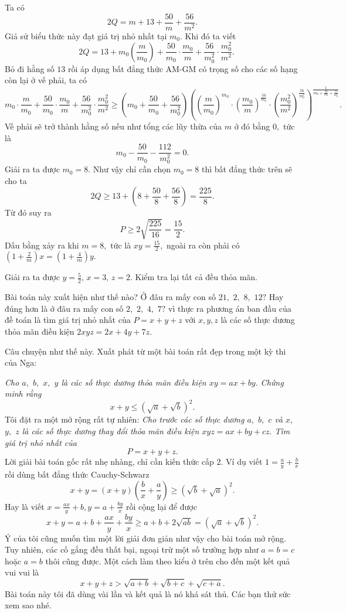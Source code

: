 \documentclass[12pt,a4paper]{book}
\begin{document}
Ta có
$$2Q = m+13+\frac{50}{m}+\frac{56}{m^2}.$$
Giả sử biểu thức này đạt giá trị nhỏ nhất tại $m_0.$ Khi đó ta viết
$$\quad 2 Q=13+m_{0}\left(\frac{m}{m_{0}}\right)+\frac{50}{m_{0}} \cdot \frac{m_{0}}{m}+\frac{56}{m_{0}^{2}} \cdot \frac{m_{0}^{2}}{m^{2}}.$$
Bỏ đi hằng số $13$ rồi áp dụng bất đẳng thức AM-GM có trọng số cho các số hạng còn lại ở vế phải, ta có
\[m_{0} \cdot \frac{m}{m_{0}} +\frac{50}{m_{0}} \cdot \frac{m_{0}}{m}+\frac{56}{m_{0}^{2}} \cdot \frac{m_{0}^{2}}{m^{2}} \geq\left(m_{0}+\frac{50}{m_{0}}+\frac{56}{m_{0}^{2}}\right)\left(\left(\frac{m}{m_{0}}\right)^{m_{0}} \cdot\left(\frac{m_{0}}{m}\right)^{\frac{50}{m_{0}}} \cdot\left(\frac{m_{0}^{2}}{m^{2}}\right)^{\frac{56}{m_{0}^{2}}}\right)^ \frac{1}{m_{0}+\frac{50}{m_{0}}+\frac{55}{m_{0}^{2}}}.\]
Vế phải sẽ trở thành hằng số nếu như tổng các lũy thừa của $m$ ở đó bằng $0,$ tức là
$$m_{0}-\frac{50}{m_{0}}-\frac{112}{m_{0}^{2}}=0.$$
Giải ra ta được ${m}_{0}=8 .$ Như vậy chỉ cần chọn ${m}_{0}=8$ thì bất đẳng thức trên sẽ cho ta
$$2 Q \geq 13+\left(8+\frac{50}{8}+\frac{56}{8}\right)=\frac{225}{8} .$$
Từ đó suy ra
$$P \geq 2 \sqrt{\frac{225}{16}}=\frac{15}{2}.$$
Dấu bằng xảy ra khi $m = 8,$ tức là $xy = \frac{15}{2},$ ngoài ra còn phải có $\left(1+\frac{2}{m}\right) x=\left(1+\frac{4}{m}\right) y.$

Giải ra ta được $y=\frac{5}{2},\,x=3,\,z=2.$ Kiểm tra lại tất cả đều thỏa mãn.

Bài toán này xuất hiện như thế nào? Ở đâu ra mấy con số $21,$ $2,$ $8,$ $12?$ Hay đúng hơn là ở đâu ra mấy con số $2,$ $2,$ $4,$ $7?$ vì thực ra phương án ban đầu của đề toán là tìm giá trị nhỏ nhất của ${P}={x}+{y}+{z}$ với ${x}, {y}, {z}$ là các số thực dương thỏa mãn điều kiện $2 {xyz}=2 {x}+4 {y}+7 {z}.$

Câu chuyện như thế này. Xuất phát từ một bài toán rất đẹp trong một kỳ thi của Nga:

\textit{Cho $a,$ $b,$ $x,$ $y$ là các số thực dương thỏa mãn điều kiện $xy = ax + by.$ Chứng minh rằng}
$$x+y \leq(\sqrt{a}+\sqrt{b})^{2}.$$
Tôi đặt ra một mở rộng rất tự nhiên: \textit{Cho trước các số thực dương $a,$ $b,$ $c$ và $x,$ $y,$ $z$ là các số thực dương thay đổi thỏa mãn điều kiện $xyz = ax+by + cz .$ Tìm giá trị nhỏ nhất của}
$$P=x+y+z.$$
Lời giải bài toán gốc rất nhẹ nhàng, chỉ cần kiến thức cấp $2.$ Ví dụ viết $1= \frac{a}{y}+\frac{b}{x}$ rồi dùng bất đẳng thức Cauchy-Schwarz
$$x+y=(x+y)\left(\frac{b}{x}+\frac{a}{y}\right) \geq(\sqrt{b}+\sqrt{a})^{2} .$$
Hay là viết $x=\frac{a x}{y}+b, y=a+\frac{b y}{x}$ rồi cộng lại để được
$$x+y=a+b+\frac{a x}{y}+\frac{b y}{x} \geq a+b+2 \sqrt{a b}=(\sqrt{a}+\sqrt{b})^{2}.$$
Ý của tôi cũng muốn tìm một lời giải đơn giản như vậy cho bài toán mở rộng. Tuy nhiên, các cố gắng đều thất bại, ngoại trừ một số trường hợp như $a = b = c$ hoặc $a = b$ thôi cũng được. Một cách làm theo kiểu ở trên cho đến một kết quả vui vui là
$$x+y+z>\sqrt{a+b}+\sqrt{b+c}+\sqrt{c+a}.$$
Bài toán này tôi đã dùng vài lần và kết quả là nó khá sát thủ. Các bạn thử sức xem sao nhé.
\end{document}
